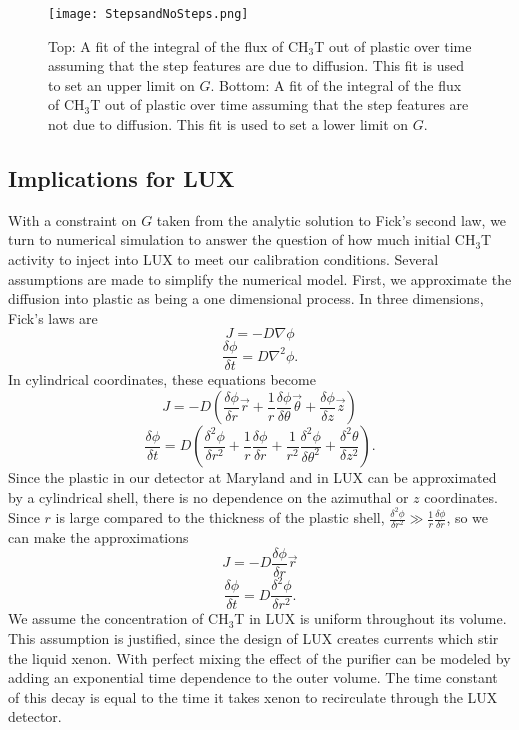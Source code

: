 \begin{figure}[H]
\centering
\texttt{[image: StepsandNoSteps.png]}
\caption{Top: A fit of the integral of the flux of CH$_3$T out of plastic over time assuming that the step features are due to diffusion.  This fit is used to set an upper limit on $G$.  Bottom: A fit of the integral of the flux of CH$_3$T out of plastic over time assuming that the step features are not due to diffusion.  This fit is used to set a lower limit on $G$. }
\label{fig:StepsFit}
\end{figure}

\subsection{Implications for LUX}

With a constraint on $G$ taken from the analytic solution to Fick's second law, we turn to numerical simulation to answer the question of how much initial CH$_3$T activity to inject into LUX to meet our calibration conditions.  Several assumptions are made to simplify the numerical model.  First, we approximate the diffusion into plastic as being a one dimensional process. In three dimensions, Fick's laws are
\[J=-D\nabla \phi\]
\[\frac{\delta\phi}{\delta t} = D \nabla^2 \phi .\]
In cylindrical coordinates, these equations become
\[J = -D (\frac{\delta \phi}{\delta r} \vec{r} + \frac{1}{r}\frac{\delta \phi}{\delta \theta}\vec{\theta} + \frac{\delta \phi}{\delta z}\vec{z})\]
\[\frac{\delta \phi}{\delta t} = D ( \frac{\delta^2\phi}{\delta r^2} + \frac{1}{r}\frac{\delta \phi}{\delta r} + \frac{1}{r^2}\frac{\delta^2 \phi}{\delta \theta^2} + \frac{\delta^2 \theta}{\delta z^2}).\]
Since the plastic in our detector at Maryland and in LUX can be approximated by a cylindrical shell, there is no dependence on the azimuthal or $z$ coordinates.  Since $r$ is large compared to the thickness of the plastic shell, $\frac{\delta^2 \phi}{\delta r^2} \gg \frac{1}{r} \frac {\delta \phi}{\delta r}$, so we can make the approximations
\[J=-D\frac{\delta \phi}{\delta r}\vec{r}\]
\[\frac{\delta \phi}{\delta t} = D \frac{\delta^2 \phi}{\delta r^2}.\]  We assume the concentration of CH$_3$T in LUX is uniform throughout its volume.  This assumption is justified, since the design of LUX creates currents which stir the liquid xenon.  With perfect mixing the effect of the purifier can be modeled by adding an exponential time dependence to the outer volume.  The time constant of this decay is equal to the time it takes xenon to recirculate through the LUX detector.

